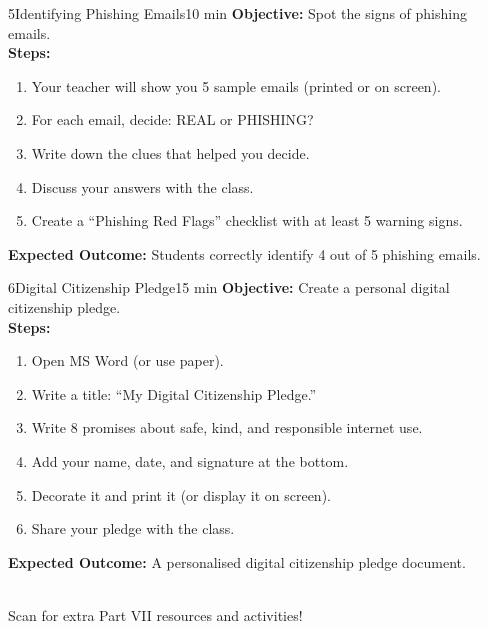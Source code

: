 \begin{labactivity}{5}{Identifying Phishing Emails}{10 min}
\textbf{Objective:} Spot the signs of phishing emails.\\[4pt]
\textbf{Steps:}
\begin{enumerate}[label=\protect\stepcircle{\arabic*}, leftmargin=2cm, itemsep=4pt]
  \item Your teacher will show you 5 sample emails (printed or on screen).
  \item For each email, decide: REAL or PHISHING?
  \item Write down the clues that helped you decide.
  \item Discuss your answers with the class.
  \item Create a ``Phishing Red Flags'' checklist with at least 5 warning signs.
\end{enumerate}
\textbf{Expected Outcome:} Students correctly identify 4 out of 5 phishing emails.
\welldone
\end{labactivity}

\begin{labactivity}{6}{Digital Citizenship Pledge}{15 min}
\textbf{Objective:} Create a personal digital citizenship pledge.\\[4pt]
\textbf{Steps:}
\begin{enumerate}[label=\protect\stepcircle{\arabic*}, leftmargin=2cm, itemsep=4pt]
  \item Open MS Word (or use paper).
  \item Write a title: ``My Digital Citizenship Pledge.''
  \item Write 8 promises about safe, kind, and responsible internet use.
  \item Add your name, date, and signature at the bottom.
  \item Decorate it and print it (or display it on screen).
  \item Share your pledge with the class.
\end{enumerate}
\textbf{Expected Outcome:} A personalised digital citizenship pledge document.
\welldone
\end{labactivity}

\vspace{12pt}
\begin{center}
  \\[6pt]
  {\small\sffamily\textcolor{NavyBlue}{Scan for extra Part VII resources and activities!}}
\end{center}
